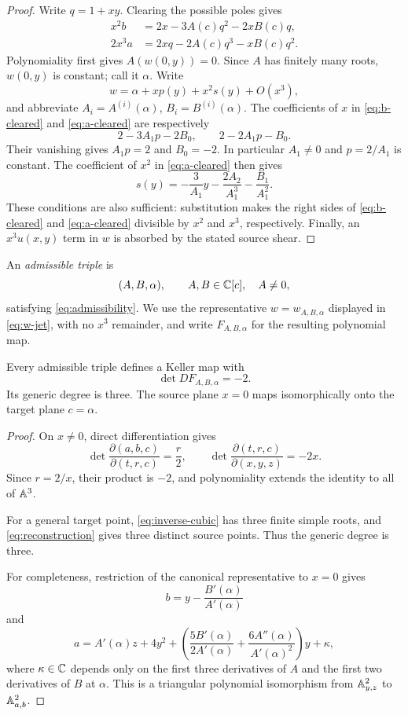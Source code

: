 \documentclass[11pt,reqno]{amsart}
\begin{document}
\begin{proof}
Write \(q=1+xy\).  Clearing the possible poles gives
\begin{align}
x^2b&=2x-3A(c)q^2-2xB(c)q,\label{eq:b-cleared}\\
2x^3a&=2xq-2A(c)q^3-xB(c)q^2.\label{eq:a-cleared}
\end{align}
Polynomiality first gives \(A(w(0,y))=0\).  Since \(A\) has finitely many
roots, \(w(0,y)\) is constant; call it \(\alpha\).  Write
\[
w=\alpha+xp(y)+x^2s(y)+O(x^3),
\]
and abbreviate \(A_i=A^{(i)}(\alpha)\), \(B_i=B^{(i)}(\alpha)\).
The coefficients of \(x\) in \eqref{eq:b-cleared} and
\eqref{eq:a-cleared} are respectively
\[
2-3A_1p-2B_0,\qquad 2-2A_1p-B_0.
\]
Their vanishing gives \(A_1p=2\) and \(B_0=-2\).  In particular
\(A_1\ne0\) and \(p=2/A_1\) is constant.  The coefficient of \(x^2\) in
\eqref{eq:a-cleared} then gives
\[
s(y)=-\frac3{A_1}y-\frac{2A_2}{A_1^3}-\frac{B_1}{A_1^2}.
\]
These conditions are also sufficient: substitution makes the right sides of
\eqref{eq:b-cleared} and \eqref{eq:a-cleared} divisible by \(x^2\) and
\(x^3\), respectively.  Finally, an \(x^3u(x,y)\) term in \(w\) is absorbed
by the stated source shear.
\end{proof}

\begin{definition}
\label{def:admissible}
An \emph{admissible triple} is
\[
(A,B,\alpha),\qquad
A,B\in\mathbb C[c],\quad A\ne0,
\]
satisfying \eqref{eq:admissibility}.  We use the representative
\(w=w_{A,B,\alpha}\) displayed in \eqref{eq:w-jet}, with no \(x^3\)
remainder, and write \(F_{A,B,\alpha}\) for the resulting polynomial map.
\end{definition}

\begin{proposition}
\label{prop:keller-degree}
Every admissible triple defines a Keller map with
\[
\det D F_{A,B,\alpha}=-2.
\]
Its generic degree is three.  The source plane \(x=0\) maps isomorphically
onto the target plane \(c=\alpha\).
\end{proposition}

\begin{proof}
On \(x\ne0\), direct differentiation gives
\[
\det\frac{\partial(a,b,c)}{\partial(t,r,c)}=\frac r2,
\qquad
\det\frac{\partial(t,r,c)}{\partial(x,y,z)}=-2x.
\]
Since \(r=2/x\), their product is \(-2\), and polynomiality extends the
identity to all of \(\mathbb A^3\).

For a general target point, \eqref{eq:inverse-cubic} has three finite simple
roots, and \eqref{eq:reconstruction} gives three distinct source points.
Thus the generic degree is three.

For completeness, restriction of the canonical representative to \(x=0\)
gives
\[
b=y-\frac{B'(\alpha)}{A'(\alpha)}
\]
and
\[
a=A'(\alpha)z+4y^2+
\left(
\frac{5B'(\alpha)}{2A'(\alpha)}
+\frac{6A''(\alpha)}{A'(\alpha)^2}
\right)y+\kappa,
\]
where \(\kappa\in\mathbb C\) depends only on the first three derivatives of \(A\)
and the first two derivatives of \(B\) at \(\alpha\).  This is a triangular
polynomial isomorphism from \(\mathbb A^2_{y,z}\) to \(\mathbb A^2_{a,b}\).
\end{proof}
\end{document}
